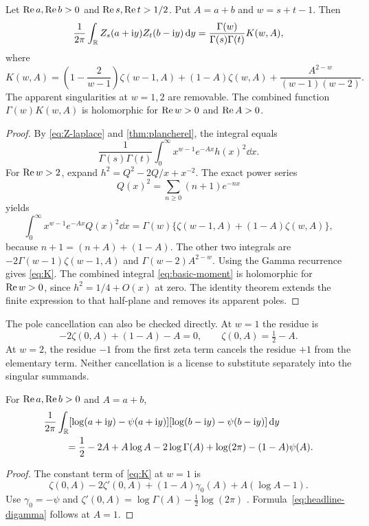 \begin{theorem}\label{thm:basic}
Let $\operatorname{Re} a,\operatorname{Re} b>0$ and $\operatorname{Re} s,\operatorname{Re} t>1/2$. Put
$A=a+b$ and $w=s+t-1$. Then
\begin{equation}\label{eq:basic-pair}
 \frac1{2\pi}\int_{\mathbb R}Z_s(a+\mathrm i y)Z_t(b-\mathrm i y)\,\mathrm d y
   =\frac{\Gamma(w)}{\Gamma(s)\Gamma(t)}K(w,A),
\end{equation}
where
\begin{equation}\label{eq:K}
 \boxed{\displaystyle
 K(w,A)=\left(1-\frac2{w-1}\right)\zeta(w-1,A)
 +(1-A)\zeta(w,A)
 +\frac{A^{2-w}}{(w-1)(w-2)}.}
\end{equation}
The apparent singularities at $w=1,2$ are removable. The combined function
$\Gamma(w)K(w,A)$ is holomorphic for $\operatorname{Re} w>0$ and $\operatorname{Re} A>0$.
\end{theorem}
\begin{proof}
By \eqref{eq:Z-laplace} and \cref{thm:plancherel}, the integral equals
\begin{equation}\label{eq:basic-moment}
 \frac1{\Gamma(s)\Gamma(t)}
   \int_0^\infty x^{w-1}e^{-Ax}h(x)^2\dd x.
\end{equation}
For $\operatorname{Re} w>2$, expand $h^2=Q^2-2Q/x+x^{-2}$.
The exact power series
\[
 Q(x)^2=\sum_{n\ge0}(n+1)e^{-nx}
\]
yields
\[
 \int_0^\infty x^{w-1}e^{-Ax}Q(x)^2\dd x
 =\Gamma(w)\{\zeta(w-1,A)+(1-A)\zeta(w,A)\},
\]
because $n+1=(n+A)+(1-A)$. The other two integrals are
$-2\Gamma(w-1)\zeta(w-1,A)$ and $\Gamma(w-2)A^{2-w}$.
Using the Gamma recurrence gives \eqref{eq:K}.
The combined integral \eqref{eq:basic-moment} is holomorphic for
$\operatorname{Re} w>0$, since $h^2=1/4+O(x)$ at zero. The identity theorem extends
the finite expression to that half-plane and removes its apparent poles.
\end{proof}

The pole cancellation can also be checked directly. At $w=1$ the residue
is
\[
 -2\zeta(0,A)+(1-A)-A=0,
 \qquad \zeta(0,A)=\tfrac12-A.
\]
At $w=2$, the residue $-1$ from the first zeta term cancels the residue
$+1$ from the elementary term. Neither cancellation is a license to
substitute separately into the singular summands.

\begin{corollary}\label{thm:digamma}
For $\operatorname{Re} a,\operatorname{Re} b>0$ and $A=a+b$,
\begin{align}
 &\frac1{2\pi}\int_{\mathbb R}
 [\log(a+\mathrm i y)-\psi(a+\mathrm i y)]
 [\log(b-\mathrm i y)-\psi(b-\mathrm i y)]\,\mathrm d y \notag\\
 &\hspace{8mm}=
 \frac12-2A+A\log A-2\log\Gamma(A)+\log(2\pi)
       -(1-A)\psi(A).\label{eq:digamma-pair}
\end{align}
\end{corollary}
\begin{proof}
The constant term of \eqref{eq:K} at $w=1$ is
\[
 \zeta(0,A)-2\zeta'(0,A)+(1-A)\gamma_0(A)+A(\log A-1).
\]
Use $\gamma_0=-\psi$ and
$\zeta'(0,A)=\log\Gamma(A)-\frac12\log(2\pi)$
\cite{dlmf-zeta}. Formula~\eqref{eq:headline-digamma} follows at $A=1$.
\end{proof}

